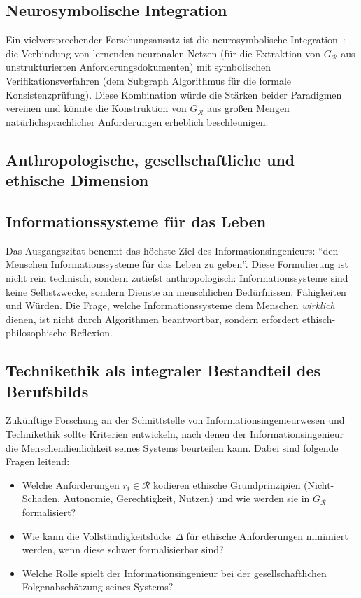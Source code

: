 ﻿\documentclass[a4paper,12pt]{report}
\theoremstyle{definition}
\begin{document}
\subsection{Neurosymbolische Integration}

Ein vielversprechender Forschungsansatz ist die neurosymbolische Integration~\cite{lamb2020}:
die Verbindung von lernenden neuronalen Netzen (für die Extraktion von $G_\mathcal{R}$
aus unstrukturierten Anforderungsdokumenten) mit symbolischen Verifikationsverfahren
(dem Subgraph Algorithmus für die formale Konsistenzprüfung). Diese Kombination
würde die Stärken beider Paradigmen vereinen und könnte die Konstruktion von
$G_\mathcal{R}$ aus großen Mengen natürlichsprachlicher Anforderungen erheblich
beschleunigen.

\subsection{Anthropologische, gesellschaftliche und ethische Dimension}

\subsection{Informationssysteme für das Leben}

Das Ausgangszitat benennt das höchste Ziel des Informationsingenieurs:
\enquote{den Menschen Informationssysteme für das Leben zu geben}. Diese Formulierung
ist nicht rein technisch, sondern zutiefst anthropologisch: Informationssysteme
sind keine Selbstzwecke, sondern Dienste an menschlichen Bedürfnissen, Fähigkeiten
und Würden. Die Frage, welche Informationssysteme dem Menschen \emph{wirklich} dienen,
ist nicht durch Algorithmen beantwortbar, sondern erfordert ethisch-philosophische
Reflexion.

\subsection{Technikethik als integraler Bestandteil des Berufsbilds}

Zukünftige Forschung an der Schnittstelle von Informationsingenieurwesen und Technikethik
sollte Kriterien entwickeln, nach denen der Informationsingenieur die Menschendienlichkeit
seines Systems beurteilen kann. Dabei sind folgende Fragen leitend:
\begin{itemize}
  \item Welche Anforderungen $r_i \in \mathcal{R}$ kodieren ethische Grundprinzipien
        (Nicht-Schaden, Autonomie, Gerechtigkeit, Nutzen) und wie werden sie in
        $G_\mathcal{R}$ formalisiert?
  \item Wie kann die Vollständigkeitslücke $\Delta$ für ethische Anforderungen
        minimiert werden, wenn diese schwer formalisierbar sind?
  \item Welche Rolle spielt der Informationsingenieur bei der gesellschaftlichen
        Folgenabschätzung seines Systems?
\end{itemize}
\end{document}
